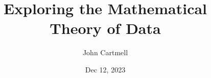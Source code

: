 
\usepackage{mathptmx}
\usepackage{amsfonts}
\usepackage{wasysym}
\usepackage{url}
\usepackage{hyperref}

\newcommand{\sharedmacros}{../../../SharedMacros}










\renewcommand{\erpictureFolder}[0]{../../../SharedPictures}
\setcounter{equation}{0}

\makeatletter
\newcommand{\xRightarrow}[2][]{\ext@arrow 0359\Rightarrowfill@{#1}{#2}}
\makeatother


\title[John Cartmell]{Exploring the Mathematical Theory of Data}

\author{John Cartmell}
\institute{\\}
\date{Dec 12, 2023}

\usepackage{framed}
\usepackage{bibentry}
\usepackage{colortbl}
\usepackage{ulem}   %
\usepackage{soul,xcolor} %

\usepackage{listings}
\usepackage{arydshln} %
\usepackage{pst-arrow} %




\newcommand{\slidecontext}{Introduction} %

\newcommand{\comingnext}[1]{
\begin{frame}{COMING NEXT}
\begin{center}
\Large #1
\end{center}
\end{frame}
}

\newcommand{\fgsourcediag}{$\binarysourcediag{a}{b}{c}{f}{g}$}
\newcommand{\rangeplus}{$\mbox{range}^+\ $}
\newcommand{\datacat}{$\gamma$-structured category}
\newcommand{\datacatw}{\datacat\ }

